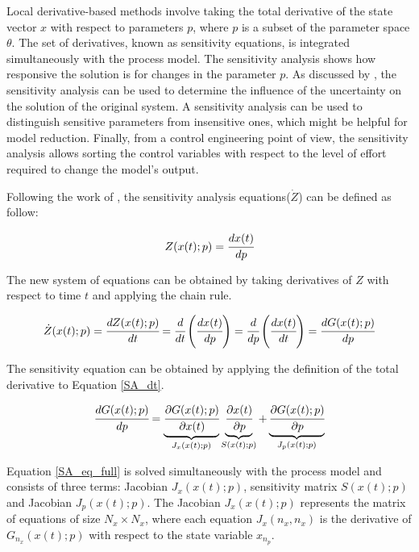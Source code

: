 \documentclass[../Article_Sensitivity_Analsysis.tex]{subfiles}
\begin{document}
	
	Local derivative-based methods involve taking the total derivative of the state vector $x$ with respect to parameters $p$, where $p$ is a subset of the parameter space $\theta$. The set of derivatives, known as sensitivity equations, is integrated simultaneously with the process model. The sensitivity analysis shows how responsive the solution is for changes in the parameter $p$. As discussed by \citet{Dickinson1976}, the sensitivity analysis can be used to determine the influence of the uncertainty on the solution of the original system. A sensitivity analysis can be used to distinguish sensitive parameters from insensitive ones, which might be helpful for model reduction. Finally, from a control engineering point of view, the sensitivity analysis allows sorting the control variables with respect to the level of effort required to change the model's output.
	
	Following the work of \citet{Maly1996}, the sensitivity analysis equations(${\dot{Z}}$) can be defined as follow:
	
	{\footnotesize
		\begin{equation}
			\label{SA_def}
			Z(x(t);p) = \cfrac{dx(t)}{dp}
	   \end{equation} }
	
	The new system of equations can be obtained by taking derivatives of $Z$ with respect to time $t$ and applying the chain rule.
	
	{\footnotesize
		\begin{equation} \label{SA_dt} 
			{\dot{Z}}(x(t);p)  = \cfrac{dZ(x(t);p)}{d t} = \cfrac{d}{d t} \left( \cfrac{dx(t)}{dp} \right) = \cfrac{d }{dp} \left( \cfrac{dx(t)}{d t} \right) = \cfrac{d {G}(x(t);p)}{dp} 
	\end{equation} }
	
	The sensitivity equation can be obtained by applying the definition of the total derivative to Equation \ref{SA_dt}.
	
	{\footnotesize
		\begin{equation} \label{SA_eq_full}
			\cfrac{dG(x(t);p)}{dp} = \underbrace{ \cfrac{\partial {G}(x(t);p)}{\partial x(t)} }_{{J_x}(x(t);p)} \underbrace{\cfrac{\partial x(t)}{\partial p} }_{S(x(t);p)} + \underbrace{ \cfrac{\partial {G}(x(t);p)}{\partial p} }_{{J_p}(x(t);p)}
	  \end{equation} }
	
	Equation \ref{SA_eq_full} is solved simultaneously with the process model and consists of three terms: Jacobian ${J_x}(x(t);p)$, sensitivity matrix $S(x(t);p)$ and Jacobian ${J_p}(x(t);p)$. The Jacobian ${J_x}(x(t);p)$ represents the matrix of equations of size $N_x \times N_x$, where each equation ${J_x}(n_x,n_x)$ is the derivative of ${G}_{n_x}(x(t);p)$ with respect to the state variable $x_{n_p}$.
	
\end{document}
